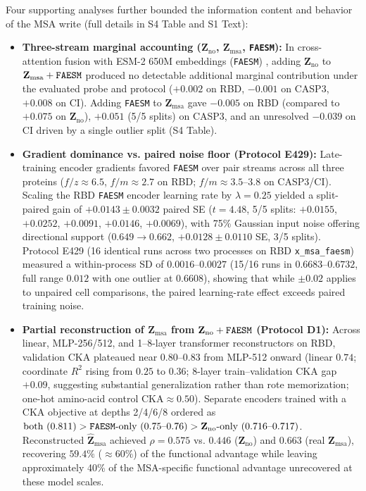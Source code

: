 \documentclass[10pt,a4paper]{article}
\begin{document}
Four supporting analyses further bounded the information content and behavior of the MSA write (full details in S4 Table and S1 Text):
\begin{itemize}
    \setlength{\itemsep}{2pt}\setlength{\parskip}{0pt}
    \item \textbf{Three-stream marginal accounting ($\mathbf{Z}_{\mathrm{no}}$, $\mathbf{Z}_{\mathrm{msa}}$, \texttt{FAESM}):} In cross-attention fusion with ESM-2 650M embeddings (\texttt{FAESM}) \citep{lin2023evolutionary}, adding $\mathbf{Z}_{\mathrm{no}}$ to $\mathbf{Z}_{\mathrm{msa}} + \text{\texttt{FAESM}}$ produced no detectable additional marginal contribution under the evaluated probe and protocol ($+0.002$ on RBD, $-0.001$ on CASP3, $+0.008$ on CI). Adding \texttt{FAESM} to $\mathbf{Z}_{\mathrm{msa}}$ gave $-0.005$ on RBD (compared to $+0.075$ on $\mathbf{Z}_{\mathrm{no}}$), $+0.051$ (5/5 splits) on CASP3, and an unresolved $-0.039$ on CI driven by a single outlier split (S4 Table).
    \item \textbf{Gradient dominance vs. paired noise floor (Protocol E429):} Late-training encoder gradients favored \texttt{FAESM} over pair streams across all three proteins ($f/z \approx 6.5$, $f/m \approx 2.7$ on RBD; $f/m \approx 3.5$--$3.8$ on CASP3/CI). Scaling the RBD \texttt{FAESM} encoder learning rate by $\lambda = 0.25$ yielded a split-paired gain of $+0.0143 \pm 0.0032$ paired SE ($t = 4.48$, 5/5 splits: $+0.0155$, $+0.0252$, $+0.0091$, $+0.0146$, $+0.0069$), with 75\% Gaussian input noise offering directional support ($0.649 \rightarrow 0.662$, $+0.0128 \pm 0.0110$ SE, 3/5 splits). Protocol E429 (16 identical runs across two processes on RBD \texttt{x\_msa\_faesm}) measured a within-process SD of $0.0016$--$0.0027$ (15/16 runs in $0.6683$--$0.6732$, full range $0.012$ with one outlier at $0.6608$), showing that while $\pm 0.02$ applies to unpaired cell comparisons, the paired learning-rate effect exceeds paired training noise.
    \item \textbf{Partial reconstruction of $\mathbf{Z}_{\mathrm{msa}}$ from $\mathbf{Z}_{\mathrm{no}} + \text{\texttt{FAESM}}$ (Protocol D1):} Across linear, MLP-256/512, and 1--8-layer transformer reconstructors on RBD, validation CKA plateaued near $0.80$--$0.83$ from MLP-512 onward (linear $0.74$; coordinate $R^2$ rising from $0.25$ to $0.36$; 8-layer train--validation CKA gap $+0.09$, suggesting substantial generalization rather than rote memorization; one-hot amino-acid control $\text{CKA} \approx 0.50$). Separate encoders trained with a CKA objective at depths 2/4/6/8 ordered as $\text{both}~(0.811) > \text{\texttt{FAESM}-only}~(0.75\text{--}0.76) > \mathbf{Z}_{\mathrm{no}}\text{-only}~(0.716\text{--}0.717)$. Reconstructed $\hat{\mathbf{Z}}_{\mathrm{msa}}$ achieved $\rho = 0.575$ vs. $0.446$ ($\mathbf{Z}_{\mathrm{no}}$) and $0.663$ (real $\mathbf{Z}_{\mathrm{msa}}$), recovering $59.4\%$ ($\approx 60\%$) of the functional advantage while leaving approximately 40\% of the MSA-specific functional advantage unrecovered at these model scales.

\end{itemize}
\end{document}
